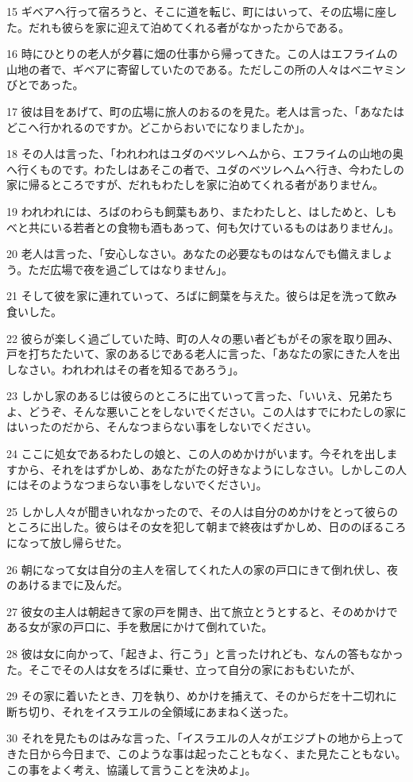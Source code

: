 \par 15 ギベアへ行って宿ろうと、そこに道を転じ、町にはいって、その広場に座した。だれも彼らを家に迎えて泊めてくれる者がなかったからである。
\par 16 時にひとりの老人が夕暮に畑の仕事から帰ってきた。この人はエフライムの山地の者で、ギベアに寄留していたのである。ただしこの所の人々はベニヤミンびとであった。
\par 17 彼は目をあげて、町の広場に旅人のおるのを見た。老人は言った、「あなたはどこへ行かれるのですか。どこからおいでになりましたか」。
\par 18 その人は言った、「われわれはユダのベツレヘムから、エフライムの山地の奥へ行くものです。わたしはあそこの者で、ユダのベツレヘムへ行き、今わたしの家に帰るところですが、だれもわたしを家に泊めてくれる者がありません。
\par 19 われわれには、ろばのわらも飼葉もあり、またわたしと、はしためと、しもべと共にいる若者との食物も酒もあって、何も欠けているものはありません」。
\par 20 老人は言った、「安心しなさい。あなたの必要なものはなんでも備えましょう。ただ広場で夜を過ごしてはなりません」。
\par 21 そして彼を家に連れていって、ろばに飼葉を与えた。彼らは足を洗って飲み食いした。
\par 22 彼らが楽しく過ごしていた時、町の人々の悪い者どもがその家を取り囲み、戸を打ちたたいて、家のあるじである老人に言った、「あなたの家にきた人を出しなさい。われわれはその者を知るであろう」。
\par 23 しかし家のあるじは彼らのところに出ていって言った、「いいえ、兄弟たちよ、どうぞ、そんな悪いことをしないでください。この人はすでにわたしの家にはいったのだから、そんなつまらない事をしないでください。
\par 24 ここに処女であるわたしの娘と、この人のめかけがいます。今それを出しますから、それをはずかしめ、あなたがたの好きなようにしなさい。しかしこの人にはそのようなつまらない事をしないでください」。
\par 25 しかし人々が聞きいれなかったので、その人は自分のめかけをとって彼らのところに出した。彼らはその女を犯して朝まで終夜はずかしめ、日ののぼるころになって放し帰らせた。
\par 26 朝になって女は自分の主人を宿してくれた人の家の戸口にきて倒れ伏し、夜のあけるまでに及んだ。
\par 27 彼女の主人は朝起きて家の戸を開き、出て旅立とうとすると、そのめかけである女が家の戸口に、手を敷居にかけて倒れていた。
\par 28 彼は女に向かって、「起きよ、行こう」と言ったけれども、なんの答もなかった。そこでその人は女をろばに乗せ、立って自分の家におもむいたが、
\par 29 その家に着いたとき、刀を執り、めかけを捕えて、そのからだを十二切れに断ち切り、それをイスラエルの全領域にあまねく送った。
\par 30 それを見たものはみな言った、「イスラエルの人々がエジプトの地から上ってきた日から今日まで、このような事は起ったこともなく、また見たこともない。この事をよく考え、協議して言うことを決めよ」。

